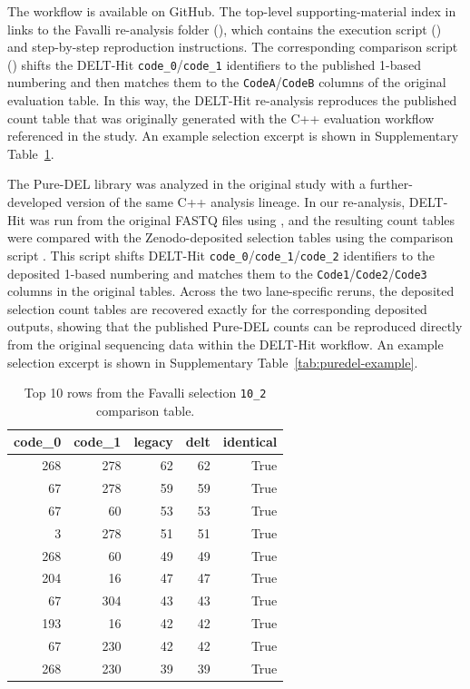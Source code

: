 \documentclass[pdflatex,sn-nature]{sn-jnl}
\begin{document}
{\sloppy
The workflow is available on GitHub. The top-level supporting-material index in  links to the Favalli re-analysis folder (), which contains the execution script () and step-by-step reproduction instructions. The corresponding comparison script () shifts the DELT-Hit \texttt{code\_0}/\texttt{code\_1} identifiers to the published 1-based numbering and then matches them to the \texttt{CodeA}/\texttt{CodeB} columns of the original evaluation table. In this way, the DELT-Hit re-analysis reproduces the published count table that was originally generated with the C++ evaluation workflow referenced in the study. An example selection excerpt is shown in Supplementary Table~\ref{tab:favalli-example}.

The Pure-DEL library was analyzed in the original study with a further-developed version of the same C++ analysis lineage. In our re-analysis, DELT-Hit was run from the original FASTQ files using , and the resulting count tables were compared with the Zenodo-deposited selection tables using the comparison script . This script shifts DELT-Hit \texttt{code\_0}/\texttt{code\_1}/\texttt{code\_2} identifiers to the deposited 1-based numbering and matches them to the \texttt{Code1}/\texttt{Code2}/\texttt{Code3} columns in the original tables. Across the two lane-specific reruns, the deposited selection count tables are recovered exactly for the corresponding deposited outputs, showing that the published Pure-DEL counts can be reproduced directly from the original sequencing data within the DELT-Hit workflow. An example selection excerpt is shown in Supplementary Table~\ref{tab:puredel-example}.
\par}

\begin{table}[htbp]
\centering
\small
\caption{Top 10 rows from the Favalli selection \texttt{10\_2} comparison table.}
\label{tab:favalli-example}
\begin{tabular}{rrrrr}
\toprule
\textbf{code\_0} & \textbf{code\_1} & \textbf{legacy} & \textbf{delt} & \textbf{identical} \\
\midrule
268 & 278 & 62 & 62 & True \\
67 & 278 & 59 & 59 & True \\
67 & 60 & 53 & 53 & True \\
3 & 278 & 51 & 51 & True \\
268 & 60 & 49 & 49 & True \\
204 & 16 & 47 & 47 & True \\
67 & 304 & 43 & 43 & True \\
193 & 16 & 42 & 42 & True \\
67 & 230 & 42 & 42 & True \\
268 & 230 & 39 & 39 & True \\
\bottomrule
\end{tabular}
\end{table}
\end{document}
